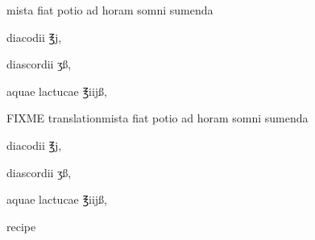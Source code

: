 \begin{Prescription}[H]
\begin{prescriptionbox}{}{\textlatin{mista fiat potio ad horam somni sumenda}}
\item \textlatin{diacodii ℥j},
\item \textlatin{diascordii ʒß},
\item \textlatin{aquae lactucae ℥iijß},
\end{prescriptionbox}
\begin{prescriptionbox}{FIXME translation}{\textlatin{mista fiat potio ad horam somni sumenda}}
\item \textlatin{diacodii ℥j},
\item \textlatin{diascordii ʒß},
\item \textlatin{aquae lactucae ℥iijß},
\end{prescriptionbox}
\caption{ recipe}
\end{Prescription}

